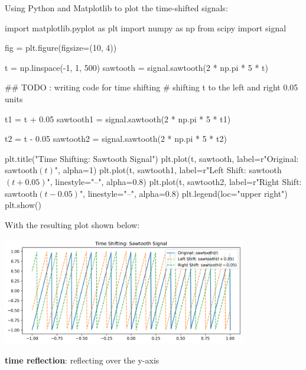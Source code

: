 \documentclass[a4paper, 10pt]{article}
\begin{document}
\begin{solution}
Using Python and Matplotlib to plot the time-shifted signals:
\begin{codingbox}
import matplotlib.pyplot as plt
import numpy as np
from scipy import signal

fig = plt.figure(figsize=(10, 4))

t = np.linspace(-1, 1, 500)
sawtooth = signal.sawtooth(2 * np.pi * 5 * t)

## TODO : writing code for time shifting
# shifting t to the left and right 0.05 units

t1 = t + 0.05
sawtooth1 = signal.sawtooth(2 * np.pi * 5 * t1)

t2 = t - 0.05
sawtooth2 = signal.sawtooth(2 * np.pi * 5 * t2)

plt.title("Time Shifting: Sawtooth Signal")
plt.plot(t, sawtooth, label=r"Original: sawtooth$(t)$", alpha=1)
plt.plot(t, sawtooth1, label=r"Left Shift: sawtooth$(t + 0.05)$", linestyle="--", alpha=0.8)
plt.plot(t, sawtooth2, label=r"Right Shift: sawtooth$(t - 0.05)$", linestyle="--", alpha=0.8)
plt.legend(loc="upper right")
plt.show()
\end{codingbox}

With the resulting plot shown below:
\begin{center}
    \includegraphics[width=0.8\textwidth]{images/problem_6_2.png}
\end{center}
\end{solution}

\newpage

\begin{subproblems}[start=3]
    \item \textbf{time reflection}: reflecting over the y-axis
\end{subproblems}
\end{document}
